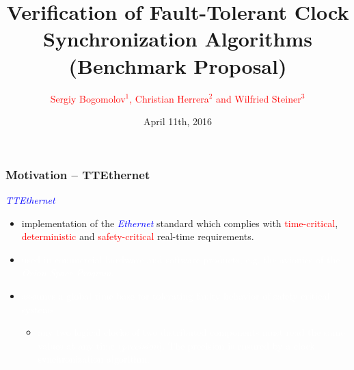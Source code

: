 \documentclass[serif]{beamer}
\begin{document}
\title{\centering \textbf{Verification of Fault-Tolerant Clock\\
Synchronization Algorithms\\ (Benchmark Proposal)}} 
\author{\textcolor{red}{Sergiy Bogomolov$^{1}$, Christian Herrera$^{2}$ and Wilfried Steiner$^{3}$}  
	}
\date{April 11th, 2016}
\begin{frame}
\titlepage
\end{frame}
 

\begin{frame}\frametitle{\textbf{Motivation -- TTEthernet}}
\emph{\textcolor{blue}{TTEthernet}}  
\begin{itemize}
\item implementation of the \emph{\textcolor{blue}{Ethernet}} standard which complies with
\textcolor{red}{time-critical}, \textcolor{red}{deterministic} and \textcolor{red}{safety-critical} real-time requirements.

\item[] \textcolor{white}{used in commercial \textcolor{white}{hardware} and \textcolor{white}{software} products,
e.g. the avionics of the \emph{\textcolor{white}{Orion Space Program}}.}

\item[] \textcolor{white}{assumes a \textcolor{white}{global time base} for tolerating faulty behavior of safety critical systems.}
	\begin{itemize}
		\item[]  \textcolor{white}{any two logical clocks of two distributed
						components must read \textcolor{white}{the same values} at any time (\emph{\textcolor{white}{precision}}).
						The precision is ensured by a \textcolor{white}{clock synchronization algorithm}. }
	\end{itemize}
\end{itemize}
\end{frame} 
\end{document}
